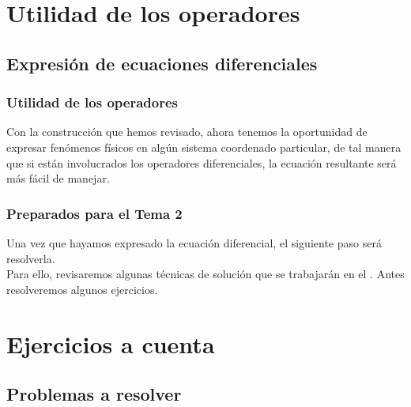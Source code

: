 \documentclass[12pt]{beamer}
\begin{document}
\section{Utilidad de los operadores}
\subsection{Expresión de ecuaciones diferenciales}

\begin{frame}
\frametitle{Utilidad de los operadores}
Con la construcción que hemos revisado, ahora tenemos la oportunidad de expresar fenómenos físicos en algún sistema coordenado particular, de tal manera que si están involucrados los operadores diferenciales, la ecuación resultante será más fácil de manejar.
\end{frame}
\begin{frame}
\frametitle{Preparados para el Tema 2}
Una vez que hayamos expresado la ecuación diferencial, el siguiente paso será resolverla.
\\
\bigskip
\pause
Para ello, revisaremos algunas técnicas de solución que se trabajarán en el \emph{}. Antes resolveremos algunos ejercicios.
\end{frame}

\section{Ejercicios a cuenta}
\subsection{Problemas a resolver}
\end{document}
